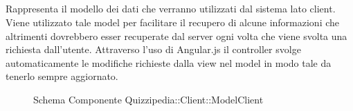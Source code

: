 \subsection{}
Rappresenta il modello dei dati che verranno utilizzati dal sistema lato client. Viene utilizzato tale model per facilitare il recupero di alcune informazioni che altrimenti dovrebbero esser recuperate dal server ogni volta che viene svolta una richiesta dall'utente.
Attraverso l'uso di Angular.js il controller svolge automaticamente le modifiche richieste dalla view nel model in modo tale da tenerlo sempre aggiornato.
\begin{figure}[H]
\centering
\noindent{}
\caption[Schema Componente Quizzipedia::Client::ModelClient]{Schema Componente Quizzipedia::Client::ModelClient}
\end{figure}
